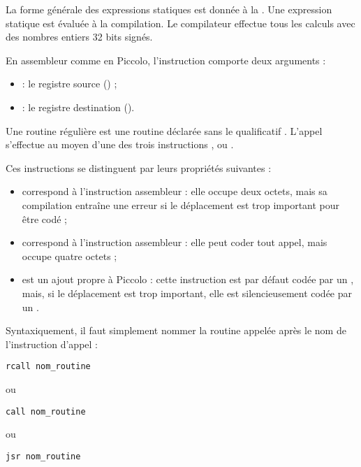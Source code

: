 La forme générale des expressions statiques est donnée à la . Une expression statique est évaluée à la compilation. Le compilateur effectue tous les calculs avec des nombres entiers 32 bits signés.








En assembleur comme en Piccolo, l'instruction  comporte deux arguments :
\begin{itemize}
  \item {} : le registre source () ;
  \item {} : le registre destination ().
\end{itemize}









Une routine régulière est une routine déclarée sans le qualificatif . L'appel s’effectue au moyen d’une des trois instructions ,  ou .

Ces instructions se distinguent par leurs propriétés suivantes :
\begin{itemize}
  \item {} correspond à l’instruction assembleur  : elle occupe deux octets, mais sa compilation entraîne une erreur si le déplacement est trop important pour être codé ;
  \item {} correspond à l’instruction assembleur  : elle peut coder tout appel, mais occupe quatre octets ;
  \item {} est un ajout propre à Piccolo : cette instruction est par défaut codée par un , mais, si le déplacement est trop important, elle est silencieusement codée par un .
\end{itemize}

Syntaxiquement, il faut simplement nommer la routine appelée après le nom de l’instruction d’appel :

\begin{lstlisting}[language=piccolo]
rcall nom_routine
\end{lstlisting}
ou
\begin{lstlisting}[language=piccolo]
call nom_routine
\end{lstlisting}
ou
\begin{lstlisting}[language=piccolo]
jsr nom_routine
\end{lstlisting}




